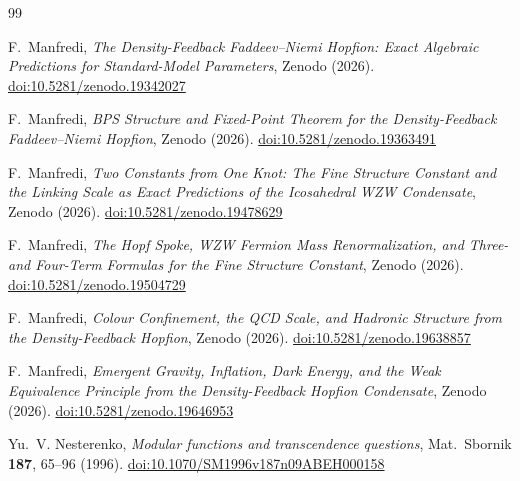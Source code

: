 \documentclass[11pt,a4paper]{article}
\theoremstyle{definition}
\theoremstyle{remark}
\begin{document}
\begin{thebibliography}{99}

F.~Manfredi,
\textit{The Density-Feedback Faddeev--Niemi Hopfion:
  Exact Algebraic Predictions for Standard-Model Parameters},
Zenodo (2026).
\href{https://doi.org/10.5281/zenodo.19342027}{doi:10.5281/zenodo.19342027}

F.~Manfredi,
\textit{BPS Structure and Fixed-Point Theorem for the
  Density-Feedback Faddeev--Niemi Hopfion},
Zenodo (2026).
\href{https://doi.org/10.5281/zenodo.19363491}{doi:10.5281/zenodo.19363491}

F.~Manfredi,
\textit{Two Constants from One Knot: The Fine Structure Constant and
  the Linking Scale as Exact Predictions of the Icosahedral WZW Condensate},
Zenodo (2026).
\href{https://doi.org/10.5281/zenodo.19478629}{doi:10.5281/zenodo.19478629}

F.~Manfredi,
\textit{The Hopf Spoke, WZW Fermion Mass Renormalization,
  and Three- and Four-Term Formulas for the Fine Structure Constant},
Zenodo (2026).
\href{https://doi.org/10.5281/zenodo.19504729}{doi:10.5281/zenodo.19504729}

F.~Manfredi,
\textit{Colour Confinement, the QCD Scale, and Hadronic Structure
  from the Density-Feedback Hopfion},
Zenodo (2026).
\href{https://doi.org/10.5281/zenodo.19638857}{doi:10.5281/zenodo.19638857}

F.~Manfredi,
\textit{Emergent Gravity, Inflation, Dark Energy, and the Weak
  Equivalence Principle from the Density-Feedback Hopfion Condensate},
Zenodo (2026).
\href{https://doi.org/10.5281/zenodo.19646953}{doi:10.5281/zenodo.19646953}

Yu.~V. Nesterenko,
\textit{Modular functions and transcendence questions},
Mat.\ Sbornik \textbf{187}, 65--96 (1996).
\href{https://doi.org/10.1070/SM1996v187n09ABEH000158}{doi:10.1070/SM1996v187n09ABEH000158}

\end{thebibliography}
\end{document}
